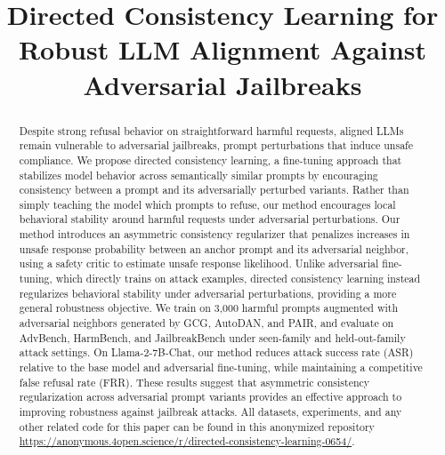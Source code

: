 \documentclass{article}
\title{Directed Consistency Learning for Robust LLM Alignment Against Adversarial Jailbreaks}
\author{%
}
\begin{document}
\maketitle

\begin{abstract}
Despite strong refusal behavior on straightforward harmful requests, aligned LLMs remain vulnerable to adversarial jailbreaks, prompt perturbations that induce unsafe compliance. We propose directed consistency learning, a fine-tuning approach that stabilizes model behavior across semantically similar prompts by encouraging consistency between a prompt and its adversarially perturbed variants. Rather than simply teaching the model which prompts to refuse, our method encourages local behavioral stability around harmful requests under adversarial perturbations. Our method introduces an asymmetric consistency regularizer that penalizes increases in unsafe response probability between an anchor prompt and its adversarial neighbor, using a safety critic to estimate unsafe response likelihood. Unlike adversarial fine-tuning, which directly trains on attack examples, directed consistency learning instead regularizes behavioral stability under adversarial perturbations, providing a more general robustness objective. We train on 3,000 harmful prompts augmented with adversarial neighbors generated by GCG, AutoDAN, and PAIR, and evaluate on AdvBench, HarmBench, and JailbreakBench under seen-family and held-out-family attack settings. On Llama-2-7B-Chat, our method reduces attack success rate (ASR) relative to the base model and adversarial fine-tuning, while maintaining a competitive false refusal rate (FRR). These results suggest that asymmetric consistency regularization across adversarial prompt variants provides an effective approach to improving robustness against jailbreak attacks. All datasets, experiments, and any other related code for this paper can be found in this anonymized repository \url{https://anonymous.4open.science/r/directed-consistency-learning-0654/}.
\end{abstract}


\end{document}
